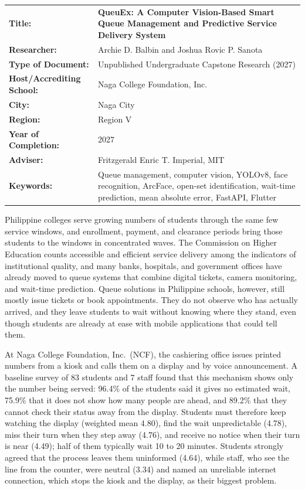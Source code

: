 \documentclass{research}
\newcommand{\sysname}{QueuEx}
\begin{document}
\noindent
\begin{tabular}{p{} p{}}
\textbf{Title:} &
  \textbf{\sysname{}: A Computer Vision-Based Smart Queue Management and
  Predictive Service Delivery System} \\[0.25em]
\textbf{Researcher:} &
  Archie D. Balbin and Joshua Rovic P. Sanota \\[0.25em]
\textbf{Type of Document:} &
  Unpublished Undergraduate Capstone Research (2027) \\[0.25em]
\textbf{Host/Accrediting School:} &
  Naga College Foundation, Inc. \\[0.25em]
\textbf{City:} & Naga City \\[0.25em]
\textbf{Region:} & Region V \\[0.25em]
\textbf{Year of Completion:} & 2027 \\[0.25em]
\textbf{Adviser:} & Fritzgerald Enric T. Imperial, MIT \\[0.25em]
\textbf{Keywords:} &
  Queue management, computer vision, YOLOv8, face recognition, ArcFace,
  open-set identification, wait-time prediction, mean absolute error,
  FastAPI, Flutter \\
\end{tabular}

\vspace{1em}

Philippine colleges serve growing numbers of students through the same
few service windows, and enrollment, payment, and clearance periods
bring those students to the windows in concentrated waves. The
Commission on Higher Education counts accessible and efficient service
delivery among the indicators of institutional quality, and many banks,
hospitals, and government offices have already moved to queue systems
that combine digital tickets, camera monitoring, and wait-time
prediction. Queue solutions in Philippine schools, however, still mostly
issue tickets or book appointments. They do not observe who has actually
arrived, and they leave students to wait without knowing where they
stand, even though students are already at ease with mobile
applications that could tell them.

At Naga College Foundation, Inc.\ (NCF), the cashiering office issues
printed numbers from a kiosk and calls them on a display and by voice
announcement. A baseline survey of 83 students and 7 staff found that
this mechanism shows only the number being served: 96.4\% of the
students said it gives no estimated wait, 75.9\% that it does not show
how many people are ahead, and 89.2\% that they cannot check their
status away from the display. Students must therefore keep watching the
display (weighted mean 4.80), find the wait unpredictable (4.78), miss
their turn when they step away (4.76), and receive no notice when their
turn is near (4.49); half of them typically wait 10 to 20 minutes.
Students strongly agreed that the process leaves them uninformed
(4.64), while staff, who see the line from the counter, were neutral
(3.34) and named an unreliable internet connection, which stops the
kiosk and the display, as their biggest problem.
\end{document}
